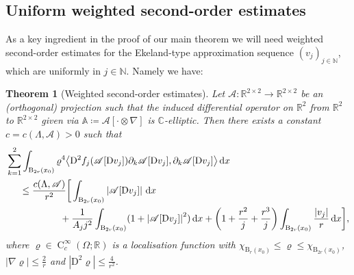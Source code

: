 \documentclass[a4paper,10pt,reqno,oneside]{amsart}
\numberwithin{equation}{section}
\newcommand{\R}{\mathbb R}
\newcommand{\C}{\mathbb C}
\newcommand{\N}{\mathbb N}
\newcommand{\ball}{\mathrm{B}}
\newcommand{\A}{\mathscr{A}}
\newcommand{\Aop}{\mathbb{A}}
\newcommand{\hold}{\operatorname{C}}
\newcommand{\D}{\mathrm{D}}
\newcommand{\intd}{\,\mathrm{d}}
\newcommand{\dx}[1]{\,\mathrm{d}#1}
\newcommand{\skalarProd}[2]{\big\langle#1,#2\big\rangle}
\newcommand{\abs}[1]{\left\lvert#1\right\rvert}
\newcommand{\F}{\mathscr{F}}
\newtheorem{thm}{Theorem}[section]
\begin{document}
\subsection{Uniform weighted second-order estimates}

As a  key ingredient in the proof of our main theorem  we will need  weighted second-order estimates for the Ekeland-type approximation sequence $(v_j)_{j\in\N}$, which are uniformly in $j\in\N$. Namely we have:

\begin{thm}[Weighted second-order estimates] Let $\A:\R^{2\times 2}\to\R^{2\times2}$ be an (orthogonal) projection such that the induced differential operator on $\R^2$ from $\R^2$ to $\R^{2\times2}$ given via $\Aop\coloneqq \A[\cdot\otimes \nabla]$ is $\C$-elliptic. Then there exists a constant $c=c(\Lambda, \A)>0$ such that
\begin{align}\label{eq:WeightedSecondOrder}
&\sum_{k=1}^2 \int_{\ball_{2r}(x_0)}\varrho^4 \skalarProd{\D^2f_j(\A[\D v_j])\partial_k\A[\D v_j]}{\partial_k\A[\D v_j]}\intd x\notag \\
&\hspace{0.5cm}\leq \frac{c(\Lambda,\A)}{r^2} \bigg[\int_{\ball_{2r}(x_0)} \abs{\A [\D v_j]}\dx{x}\\
&\hspace{2cm}+ \frac{1}{A_j j^2}\int_{\ball_{2r}(x_0)} (1+\abs{\A [\D v_j]}^2)\dx{x}
+ \bigg(1+\frac{r^2}{j}+\frac{r^3}{j} \bigg)\int_{\ball_{2r}(x_0)} \frac{\abs{v_j}}{r}\dx{x} \bigg]\notag,
\end{align}
where $\varrho\in\hold^\infty_c(\Omega;\R)$ is a localisation function with $\chi_{\ball_{r}(x_0)}\le\varrho\le\chi_{\ball_{2r}(x_0)}$, $\abs{\nabla  \varrho} \leq \frac2r$ and $\abs{\D^2\varrho}\le\frac{4}{r^2}$.
\end{thm}
\end{document}
